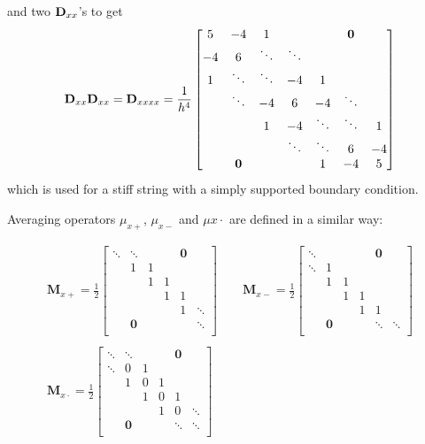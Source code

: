 and two $\mathbf{D}_{xx}$'s to get
\begin{equation}
    \mathbf{D}_{xx}\mathbf{D}_{xx} = \mathbf{D}_{xxxx} = \frac{1}{h^4}\begin{bmatrix}
        5& -4 & 1 & & & \mathbf{0}& \\
        -4 & 6 &\ddots &\ddots & & & \\
        1& \ddots & \ddots & -4 & 1 & & \\
        & \ddots& -4 & 6 & -4 & \ddots& \\
        & & 1 & -4 & \ddots & \ddots &1 \\
        & & & \ddots & \ddots & 6 & -4 \\
        & \mathbf{0} & & & 1& -4 & 5 \\
    \end{bmatrix}
\end{equation}
which is used for a stiff string with a simply supported boundary condition.

Averaging operators $\mu_{x+}$, $\mu_{x-}$ and $\mu{x\cdot}$ are defined in a similar way:

\begin{gather*}
    \mathbf{M}_{x+} = \frac{1}{2}\begin{bmatrix}
        \ddots &\ddots & & & \mathbf{0}&\\
         & 1 & 1 & & & \\
        & & 1 & 1 & & \\
        & & & 1 & 1 & \\
        & & & & 1 & \ddots\\
        &\mathbf{0} & & & & \ddots \\
    \end{bmatrix}
    \qquad
    \mathbf{M}_{x-} = \frac{1}{2}\begin{bmatrix}
        \ddots & & & & \mathbf{0}&\\
        \ddots & 1 & & & & \\
        & 1 & 1 & & & \\
        & & 1 & 1 & & \\
        & & & 1 & 1 & \\
        &\mathbf{0} & & & \ddots & \ddots \\
    \end{bmatrix}\\
    \\
    \mathbf{M}_{x\cdot} = \frac{1}{2}\begin{bmatrix}
        \ddots &\ddots & & & \mathbf{0}&\\
        \ddots & 0 & 1 & & & \\
        & 1 & 0 & 1 & & \\
        & & 1 & 0 & 1 & \\
        & & & 1 & 0 & \ddots \\
        &\mathbf{0} & & & \ddots & \ddots \\
    \end{bmatrix}\\
\end{gather*}

